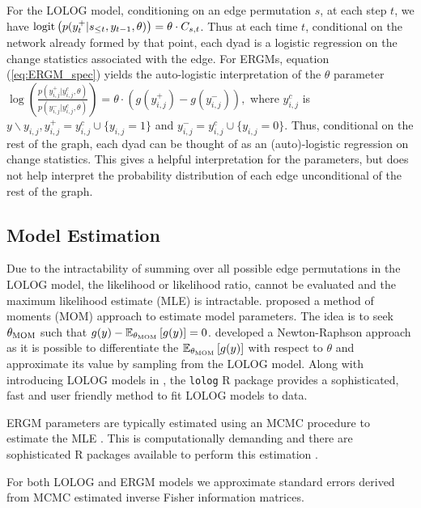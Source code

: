 \documentclass[
]{statsoc}
\begin{document}
For the LOLOG model, conditioning on an edge permutation \(s\), at each
step \(t\), we have
\({\rm logit}\left( {p(y_{t}^{+} \vert s_{\leq t}, y_{t-1}, \theta )}\right) = \theta\cdot C_{s,t}\).
Thus at each time \(t\), conditional on the network already formed by
that point, each dyad is a logistic regression on the change statistics
associated with the edge. For ERGMs, equation (\ref{eq:ERGM_spec})
yields the auto-logistic interpretation of the \(\theta\) parameter
\(\log\left(\frac{p(y_{i,j}^{+} \vert y_{i,j}^{c}, \theta )}{p(y_{i,j}^{-} \vert y_{i,j}^{c}, \theta )}\right) = \theta\cdot (g(y_{i,j}^{+}) - g(y_{i,j}^{-})),\)
where \(y_{i,j}^{c}\) is
\(y{\backslash}y_{i,j}, y_{i,j}^{+}=y_{i,j}^{c}\cup\{y_{i,j}=1\}\) and
\(y_{i,j}^{-} = y_{i,j}^{c}\cup\{y_{i,j}=0\}\). Thus, conditional on the
rest of the graph, each dyad can be thought of as an (auto)-logistic
regression on change statistics. This gives a helpful interpretation for
the parameters, but does not help interpret the probability distribution
of each edge unconditional of the rest of the graph.

\subsection{Model Estimation}

Due to the intractability of summing over all possible edge permutations
in the LOLOG model, the likelihood or likelihood ratio, cannot be
evaluated and the maximum likelihood estimate (MLE) is intractable.
\cite{Fellows2018} proposed a method of moments (MOM) approach to
estimate model parameters. The idea is to seek \(\theta_{{\rm MOM}}\)
such that
\(g(y) - \mathbb{E}_{\theta_{{\rm MOM}}}\left[ g(y) \right] = 0\).
\cite{Fellows2018} developed a Newton-Raphson approach as it is possible
to differentiate the
\(\mathbb{E}_{\theta_{{\rm MOM}}}\left[ g(y) \right]\) with respect to
\(\theta\) and approximate its value by sampling from the LOLOG model.
Along with introducing LOLOG models in \cite{Fellows2018}, the
\texttt{lolog} R package \citep{LOLOG_github} provides a sophisticated,
fast and user friendly method to fit LOLOG models to data.

ERGM parameters are typically estimated using an MCMC procedure to
estimate the MLE \citep{Snijders2002,Hunter2006}. This is
computationally demanding and there are sophisticated R packages
available to perform this estimation \citep{ergm_3_9_4}.

For both LOLOG and ERGM models we approximate standard errors derived
from MCMC estimated inverse Fisher information matrices.
\end{document}

